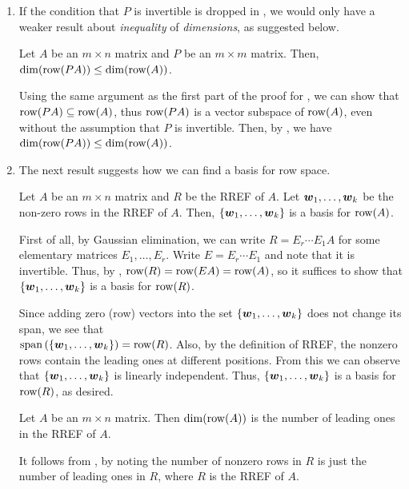 \begin{enumerate}
\item If the condition that \(P\) is invertible is dropped in
, we would only have a weaker result
about \emph{inequality} of \emph{dimensions}, as suggested below.

\begin{proposition}
\label{prp:mult-matx-reduce-row-sp-dim}
Let \(A\) be an \(m\times n\) matrix and \(P\) be an \(m\times m\) matrix. Then,
\(\dim(\operatorname{row}(PA))\le\dim(\operatorname{row}(A))\).
\end{proposition}
\begin{pf}
Using the same argument as the first part of the proof for
, we can show that
\(\operatorname{row}(PA)\subseteq \operatorname{row}(A)\), thus \(\operatorname{row}(PA)\) is a vector subspace of
\(\operatorname{row}(A)\), even without the assumption that \(P\) is invertible. Then, by
, we have \(\dim(\operatorname{row}(PA))\le\dim(\operatorname{row}(A))\).
\end{pf}

\item The next result suggests how we can find a basis for row space.
\begin{theorem}
\label{thm:nonzero-rows-basis-row-sp}
Let \(A\) be an \(m\times n\) matrix and \(R\) be the RREF of \(A\). Let
\(\vb*{w}_1,\dotsc,\vb*{w}_k\) be the non-zero rows in the RREF of \(A\).
Then, \(\{\vb*{w}_1,\dotsc,\vb*{w}_k\}\) is a basis for \(\operatorname{row}(A)\).
\end{theorem}
\begin{pf}
First of all, by Gaussian elimination, we can write \(R=E_r\dotsb E_1A\) for
some elementary matrices \(E_1,\dotsc,E_r\). Write \(E=E_r\dotsb E_1\) and note
that it is invertible. Thus, by ,
\(\operatorname{row}(R)=\operatorname{row}(EA)=\operatorname{row}(A)\), so it suffices to show that
\(\{\vb*{w}_1,\dotsc,\vb*{w}_k\}\) is a basis for \(\operatorname{row}(R)\).

Since adding zero (row) vectors into the set
\(\{\vb*{w}_1,\dotsc,\vb*{w}_k\}\) does not change its span, we see that\\
\(\operatorname{span}\qty(\{\vb*{w}_1,\dotsc,\vb*{w}_k\})=\operatorname{row}(R)\). Also, by the definition of
RREF, the nonzero rows contain the leading ones at different positions. From
this we can observe that \(\{\vb*{w}_1,\dotsc,\vb*{w}_k\}\) is linearly
independent. Thus, \(\{\vb*{w}_1,\dotsc,\vb*{w}_k\}\) is a basis for
\(\operatorname{row}(R)\), as desired.
\end{pf}
\begin{corollary}
\label{cor:dim-row-space-num-lead-ones}
Let \(A\) be an \(m\times n\) matrix. Then \(\dim(\operatorname{row}(A))\) is the number of
leading ones in the RREF of \(A\).
\end{corollary}
\begin{pf}
It follows from , by noting the number of
nonzero rows in \(R\) is just the number of leading ones in \(R\), where \(R\)
is the RREF of \(A\).
\end{pf}
\end{enumerate}
